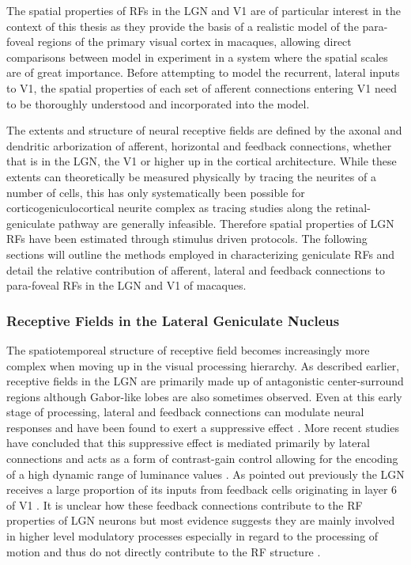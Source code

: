 The spatial properties of RFs in the LGN and V1 are of particular
interest in the context of this thesis as they provide the basis of a
realistic model of the para-foveal regions of the primary visual
cortex in macaques, allowing direct comparisons between model in
experiment in a system where the spatial scales are of great
importance. Before attempting to model the recurrent, lateral inputs
to V1, the spatial properties of each set of afferent connections
entering V1 need to be thoroughly understood and incorporated into the
model.

The extents and structure of neural receptive fields are defined by
the axonal and dendritic arborization of afferent, horizontal and
feedback connections, whether that is in the LGN, the V1 or higher up
in the cortical architecture. While these extents can theoretically be
measured physically by tracing the neurites of a number of cells, this
has only systematically been possible for corticogeniculocortical
neurite complex as tracing studies along the retinal-geniculate
pathway are generally infeasible. Therefore spatial properties of LGN
RFs have been estimated through stimulus driven protocols. The
following sections will outline the methods employed in characterizing
geniculate RFs and detail the relative contribution of afferent,
lateral and feedback connections to para-foveal RFs in the LGN and V1
of macaques.

\subsubsection{Receptive Fields in the Lateral Geniculate Nucleus}
\label{sec:LGNRF}

The spatiotemporeal structure of receptive field becomes increasingly
more complex when moving up in the visual processing hierarchy. As
described earlier, receptive fields in the LGN are primarily made up
of antagonistic center-surround regions although Gabor-like lobes are
also sometimes observed. Even at this early stage of processing,
lateral and feedback connections can modulate neural responses and
have been found to exert a suppressive effect \citep{Hubel1961}. More
recent studies have concluded that this suppressive effect is mediated
primarily by lateral connections and acts as a form of contrast-gain
control allowing for the encoding of a high dynamic range of luminance
values \cite{Bonin2005}. As pointed out previously the LGN receives a
large proportion of its inputs from feedback cells originating in
layer 6 of V1 \citep{Sherman2002}. It is unclear how these feedback
connections contribute to the RF properties of LGN neurons but most
evidence suggests they are mainly involved in higher level modulatory
processes especially in regard to the processing of motion and thus do
not directly contribute to the RF structure \citep{Sillito2006}.

